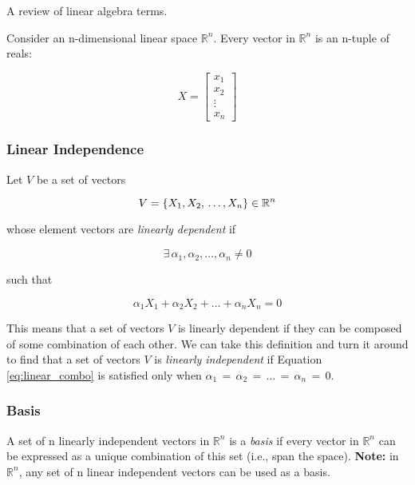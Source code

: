 A review of linear algebra terms.

Consider an n-dimensional linear space $\mathbb{R}^n$. Every vector in
$\mathbb{R}^n$ is an n-tuple of reals:

\begin{equation} \label{eq:n_tuple}
X =
\begin{bmatrix}
  x_1 \\ x_2 \\ \vdots \\ x_n
\end{bmatrix}
\end{equation}

\subsubsection{Linear Independence}

Let $V$ be a set of vectors

\begin{equation} \label{eq:set_of_vectors}
V = \{ X_1, \, \\ X_2, \, \\ \ldots, \, \\ X_n \} \in \mathbb{R}^n
\end{equation}

\noindent whose element vectors are \textit{linearly dependent} if

\begin{equation}
  \exists \, \alpha_1, \alpha_2, \ldots, \alpha_n \neq 0
\end{equation}

\noindent such that

\begin{equation} \label{eq:linear_combo}
\alpha_1 X_1 + \alpha_2 X_2 + \ldots + \alpha_n X_n = 0
\end{equation}

This means that a set of vectors $V$ is linearly dependent if they can be
composed of some combination of each other. We can take this definition and turn
it around to find that a set of vectors $V$ is \textit{linearly independent} if
Equation \ref{eq:linear_combo} is satisfied only when
$\alpha_1 \, = \, \alpha_2 \, = \, \ldots \, = \, \alpha_n \, = \, 0$.

\subsubsection{Basis}

A set of n linearly independent vectors in $\mathbb{R}^n$ is a \textit{basis}
if every vector in $\mathbb{R}^n$ can be expressed as a unique combination
of this set (i.e., span the space). \textbf{Note:} in $\mathbb{R}^n$, any set of
n linear independent vectors can be used as a basis.

